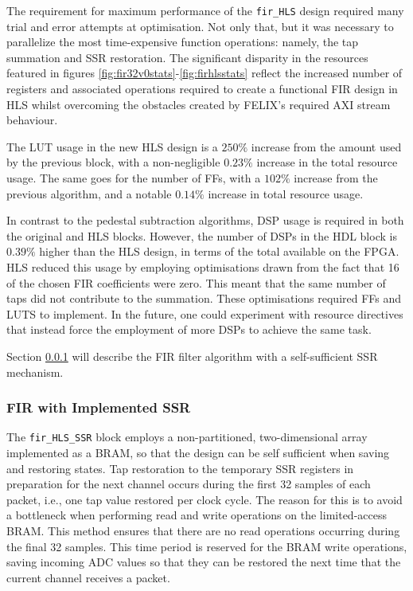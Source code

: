 \documentclass[10pt]{article}
\begin{document}
The requirement for maximum performance of the \texttt{fir\_HLS} design required many trial and error attempts at optimisation. Not only that, but it was necessary to parallelize the most time-expensive function operations: namely, the tap summation and SSR restoration. The significant disparity in the resources featured in figures \ref{fig:fir32v0stats}-\ref{fig:firhlsstats} reflect the increased number of registers and associated operations required to create a functional FIR design in HLS whilst overcoming the obstacles created by FELIX's required AXI stream behaviour.

The LUT usage in the new HLS design is a $250\%$ increase from the amount used by the previous block, with a non-negligible $0.23\%$ increase in the total resource usage. The same goes for the number of FFs, with a $102\%$ increase from the previous algorithm, and a notable $0.14\%$ increase in total resource usage.

In contrast to the pedestal subtraction algorithms, DSP usage is required in both the original and HLS blocks. However, the number of DSPs in the HDL block is $0.39\%$ higher than the HLS design, in terms of the total available on the FPGA. HLS reduced this usage by employing optimisations drawn from the fact that 16 of the chosen FIR coefficients were zero. This meant that the same number of taps did not contribute to the summation. These optimisations required FFs and LUTS to implement. In the future, one could experiment with resource directives that instead force the employment of more DSPs to achieve the same task.

Section \ref{FIR_SSR} will describe the FIR filter algorithm with a self-sufficient SSR mechanism.

\subsubsection{FIR with Implemented SSR} \label{FIR_SSR}

The \texttt{fir\_HLS\_SSR} block employs a non-partitioned, two-dimensional array implemented as a BRAM, so that the design can be self sufficient when saving and restoring states. Tap restoration to the temporary SSR registers in preparation for the next channel occurs during the first 32 samples of each packet, i.e., one tap value restored per clock cycle. The reason for this is to avoid a bottleneck when performing read and write operations on the limited-access BRAM. This method ensures that there are no read operations occurring during the final 32 samples. This time period is reserved for the BRAM write operations, saving incoming ADC values so that they can be restored the next time that the current channel receives a packet.
\end{document}
